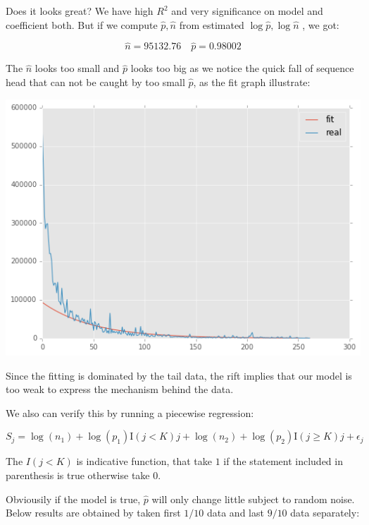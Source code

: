 \documentclass{article}
\begin{document}
Does it looks great? We have high $R^2$ and very significance on model and coefficient both. But if we compute 
$\hat{p},\hat{n}$ from  estimated $\log{\hat{p}}, \log{\hat{n}}$ , we got:

\[
\hat{n} = 95132.76 \quad \hat{p} = 0.98002
\]

The $\hat{n}$ looks too small and $\hat{p}$ looks too big as we notice the quick fall of sequence head that
can not be caught by too small $\hat{p}$, as the fit graph illustrate:

\includegraphics[scale=0.55]{simple-fit.png}

Since the fitting is dominated by the tail data, the rift implies that our model is too weak to express 
the mechanism behind the data.

We also can verify this by running a piecewise regression:

\[
S_j = \log(n_1) +  \log(p_1) \mathrm{I}(j<K) j + \log(n_2) + \log(p_2) \mathrm{I}(j \ge K)j + \epsilon_j
\]

The $I(j < K)$ is indicative function, that take $1$ if the statement included in parenthesis is true otherwise take 0.

Obviousily if the model is true, $\hat{p}$ will only change little subject to random noise. 
Below results are obtained by taken first $1/10$ data and last $9/10$ data separately:
\end{document}
